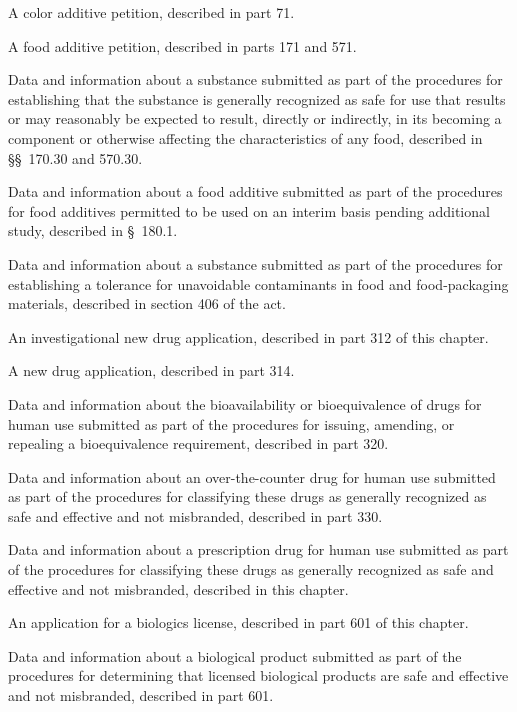 \documentclass[11pt]{article}
\begin{document}
\begin{description}[leftmargin=1.0cm,style=sameline]
\item[(1)] A color additive petition, described in part 71.
\item[(2)] A food additive petition, described in parts 171 and 571.
\item[(3)] Data and information about a substance submitted as part of the procedures for establishing that the substance is generally recognized as safe for use that results or may reasonably be expected to result, directly or indirectly, in its becoming a component or otherwise affecting the characteristics of any food, described in \S\S~170.30 and 570.30.
\item[(4)] Data and information about a food additive submitted as part of the procedures for food additives permitted to be used on an interim basis pending additional study, described in \S~180.1.
\item[(5)] Data and information about a substance submitted as part of the procedures for establishing a tolerance for unavoidable contaminants in food and food-packaging materials, described in section 406 of the act.
\item[(6)] An investigational new drug application, described in part 312 of this chapter.
\item[(7)] A new drug application, described in part 314.
\item[(8)] Data and information about the bioavailability or bioequivalence of drugs for human use submitted as part of the procedures for issuing, amending, or repealing a bioequivalence requirement, described in part 320.
\item[(9)] Data and information about an over-the-counter drug for human use submitted as part of the procedures for classifying these drugs as generally recognized as safe and effective and not misbranded, described in part 330.
\item[(10)] Data and information about a prescription drug for human use submitted as part of the procedures for classifying these drugs as generally recognized as safe and effective and not misbranded, described in this chapter.
\item[(11)] [Reserved]
\item[(12)] An application for a biologics license, described in part 601 of this chapter.
\item[(13)] Data and information about a biological product submitted as part of the procedures for determining that licensed biological products are safe and effective and not misbranded, described in part 601.

\end{description}
\end{document}
